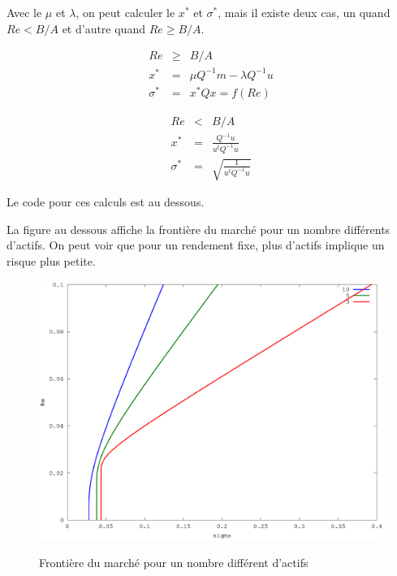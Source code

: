 \documentclass[a4paper,11pt]{article}
\begin{document}
Avec le $\mu$ et $\lambda$, on peut calculer le $x^*$ et $\sigma ^*$, mais il existe deux cas,
un quand $Re<B/A$ et d'autre quand $Re\geq B/A$.

\begin{eqnarray*}
Re&\geq& B/A\\
x^* &=& \mu Q^{-1}m - \lambda Q^{-1} u\\
\sigma ^* &=& x^*Qx=f(Re)
\end{eqnarray*}


\begin{eqnarray*}
Re&<& B/A\\
x^* &=& \frac{Q^{-1}u}{u^tQ^{-1}u}\\
\sigma ^* &=& \sqrt{\frac{1}{u^tQ^{-1}u}}
\end{eqnarray*}

Le code pour ces calculs est au dessous.
\begin{multicols}{2}
  
\end{multicols}

\newpage
La figure  au dessous affiche la  frontière du marché pour  un nombre différents
d'actifs. On peut voir que pour un rendement fixe, plus d'actifs implique un 
risque plus petite.


\begin{figure}[h!]
  \begin{centering}
    \includegraphics[scale=0.4]{redment10.eps}
    \label{rspro2}
    \par\end{centering}
  \caption{Frontière du marché pour un nombre différent d'actifs}
  \label{fig:jacobi-conv}
\end{figure}
\end{document}
